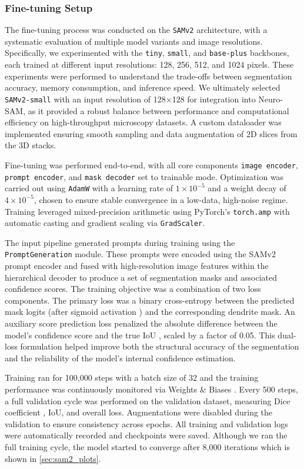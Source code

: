 \subsubsection{\textbf{Fine-tuning Setup}}
The fine-tuning process was conducted on the \texttt{\gls{SAMv2}} architecture, with a systematic evaluation of multiple model variants and image resolutions. Specifically, we experimented with the \texttt{tiny}, \texttt{small}, and \texttt{base-plus} backbones, each trained at different input resolutions: 128, 256, 512, and 1024 pixels. These experiments were performed to understand the trade-offs between segmentation accuracy, memory consumption, and inference speed. We ultimately selected \texttt{SAMv2-small} with an input resolution of 128$\times$128 for integration into Neuro-\gls{SAM}, as it provided a robust balance between performance and computational efficiency on high-throughput microscopy datasets. A custom dataloader was implemented ensuring smooth sampling and data augmentation of 2D slices from the 3D stacks. 

Fine-tuning was performed end-to-end, with all core components \texttt{image encoder}, \texttt{prompt encoder}, and \texttt{mask decoder} set to trainable mode. Optimization was carried out using \texttt{AdamW} \cite{Loshchilov_2019} with a learning rate of $1 \times 10^{-5}$ and a weight decay of $4 \times 10^{-5}$, chosen to ensure stable convergence in a low-data, high-noise regime. Training leveraged mixed-precision arithmetic using PyTorch's \texttt{torch.amp} with automatic casting and gradient scaling via \texttt{GradScaler}.

The input pipeline generated prompts during training using the \texttt{PromptGeneration} module. These prompts were encoded using the \gls{SAMv2} prompt encoder and fused with high-resolution image features within the hierarchical decoder to produce a set of segmentation masks and associated confidence scores.
The training objective was a combination of two loss components. The primary loss was a binary cross-entropy between the predicted mask logits (after sigmoid activation \cite{Zhai_2023}) and the corresponding dendrite mask. An auxiliary score prediction loss penalized the absolute difference between the model's confidence score and the true \gls{IoU} \cite{Cheng_2021}, scaled by a factor of 0.05. This dual-loss formulation helped improve both the structural accuracy of the segmentation and the reliability of the model’s internal confidence estimation.

Training ran for 100,000 steps with a batch size of 32 and the training performance was continuously monitored via Weights \& Biases \cite{WandB}. Every 500 steps, a full validation cycle was performed on the validation dataset, measuring Dice coefficient \cite{Shamir_2019}, \gls{IoU}, and overall loss. Augmentations were disabled during the validation to ensure consistency across epochs. All training and validation logs were automatically recorded and checkpoints were saved. Although we ran the full training cycle, the model started to converge after 8,000 iterations which is shown in \ref{sec:sam2_plots}. 

